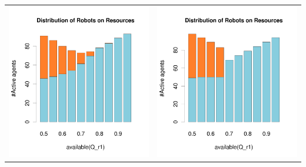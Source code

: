 \documentclass[a4paper,10pt]{article}
\begin{document}
\begin{table}[h!]
\begin{tabular}{cc}
 \newline
 \includegraphics[width=\imgSize]{images/5StaticEnv/barplotAliveR1AndR2_mean_env3}& \includegraphics[width=\imgSize]{images/5StaticEnv/barplotAliveR1AndR2_median_env3}
\end{tabular}

\end{table}
\end{document}
